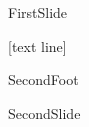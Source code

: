 \documentclass{beamer}
\begin{document}
\begin{frame}[allowframebreaks]{FirstSlide}
\lipsum[3-8]
\end{frame}

[text line]{%
\begin{beamercolorbox}[wd=\paperwidth,ht=3ex,dp=1ex]{}%
SecondFoot
\end{beamercolorbox}}

\makeatletter
\beamer@calculateheadfoot
\makeatother

\begin{frame}[allowframebreaks]{SecondSlide}
\lipsum[3-8]
\end{frame}
\end{document}

